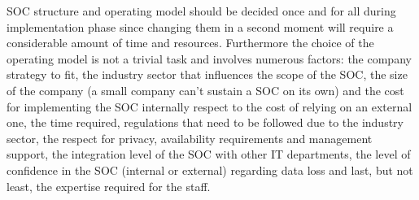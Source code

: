 SOC structure and operating model should be decided once and for all during implementation phase since changing them in a second moment will require a considerable amount of time and resources. Furthermore the choice of the operating model is not a trivial task and involves numerous factors: the company strategy to fit, the industry sector that influences the scope of the SOC, the size of the company (a small company can't sustain a SOC on its own) and the cost for implementing the SOC internally respect to the cost of relying on an external one, the time required, regulations that need to be followed due to the industry sector, the respect for privacy, availability requirements and management support, the integration level of the SOC with other IT departments, the level of confidence in the SOC (internal or external) regarding data loss and last, but not least, the expertise required for the staff.
